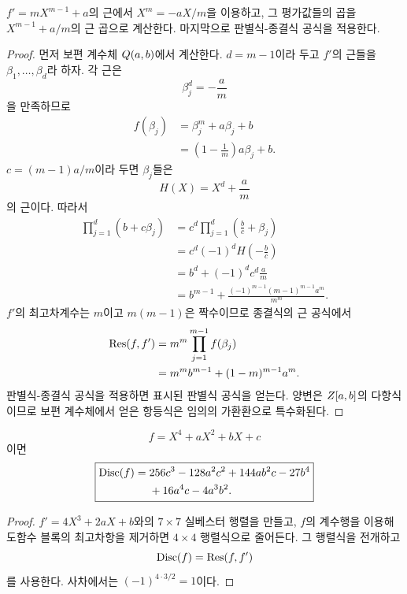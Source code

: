 \begin{proofidea}
$f'=mX^{m-1}+a$의 근에서 $X^m=-aX/m$을 이용하고, 그 평가값들의 곱을 $X^{m-1}+a/m$의 근 곱으로 계산한다. 마지막으로 판별식-종결식 공식을 적용한다.
\end{proofidea}

\begin{proof}
먼저 보편 계수체 $Q(a,b)$에서 계산한다. $d=m-1$이라 두고 $f'$의 근들을 $\beta_1,\dots,\beta_d$라 하자. 각 근은
\[
  \beta_j^d=-\frac am
\]
을 만족하므로
\[
\begin{aligned}
  f(\beta_j)
  &=\beta_j^m+a\beta_j+b\\
  &=\left(1-\frac1m\right)a\beta_j+b.
\end{aligned}
\]
$c=(m-1)a/m$이라 두면 $\beta_j$들은
\[
  H(X)=X^d+\frac am
\]
의 근이다. 따라서
\[
\begin{aligned}
  \prod_{j=1}^d(b+c\beta_j)
  &=c^d\prod_{j=1}^d\left(\frac bc+\beta_j\right)\\
  &=c^d(-1)^dH\left(-\frac bc\right)\\
  &=b^d+(-1)^d c^d\frac am\\
  &=b^{m-1}
    +\frac{(-1)^{m-1}(m-1)^{m-1}a^m}{m^m}.
\end{aligned}
\]
$f'$의 최고차계수는 $m$이고 $m(m-1)$은 짝수이므로 종결식의 근 공식에서
\[
\begin{aligned}
  \operatorname{Res}(f,f')
  &=m^m\prod_{j=1}^{m-1}f(\beta_j)\\
  &=m^m b^{m-1}
    +(1-m)^{m-1}a^m.
\end{aligned}
\]
판별식-종결식 공식을 적용하면 표시된 판별식 공식을 얻는다. 양변은 $Z[a,b]$의 다항식이므로 보편 계수체에서 얻은 항등식은 임의의 가환환으로 특수화된다.
\end{proof}

\begin{theorem}
\label{thm:depressed-quartic-discriminant}
\[
  f=X^4+aX^2+bX+c
\]
이면
\[
  \boxed{
  \begin{aligned}
  \operatorname{Disc}(f)={}&256c^3-128a^2c^2+144ab^2c
  -27b^4\\
  &+16a^4c-4a^3b^2.
  \end{aligned}}
\]
\end{theorem}

\begin{proof}
$f'=4X^3+2aX+b$와의 $7\times7$ 실베스터 행렬을 만들고, $f$의 계수행을 이용해 도함수 블록의 최고차항을 제거하면 $4\times4$ 행렬식으로 줄어든다. 그 행렬식을 전개하고
\[
  \operatorname{Disc}(f)=\operatorname{Res}(f,f')
\]
를 사용한다. 사차에서는 $(-1)^{4\cdot3/2}=1$이다.
\end{proof}

